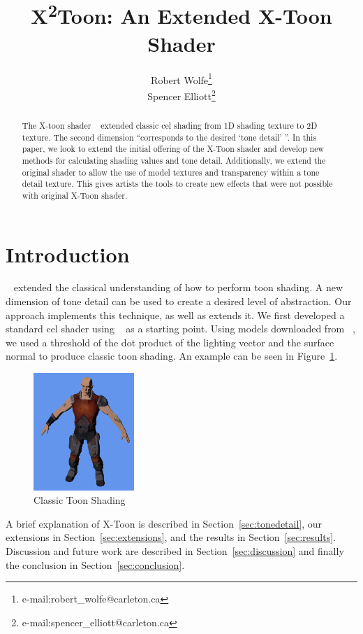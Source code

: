 \documentclass[annual]{acmsiggraph}
\title{X\texorpdfstring{\textsuperscript{2}}-Toon: An Extended X-Toon Shader}
\author{Robert Wolfe\thanks{e-mail:robert\_wolfe@carleton.ca}\\Spencer Elliott\thanks{e-mail:spencer\_elliott@carleton.ca}}
\begin{document}
\maketitle

\begin{abstract}

The X-toon shader ~\cite{BTM06a} extended classic cel shading from 1D shading texture to 2D texture. The second dimension ``corresponds to the desired `tone detail' ''. In this paper, we look to extend the initial offering of the X-Toon shader and develop new methods for calculating shading values and tone detail. Additionally, we extend the original shader to allow the use of model textures and transparency within a tone detail texture. This gives artists the tools to create new effects that were not possible with original X-Toon shader.

\end{abstract}

\keywordlist

\copyrightspace

\section{Introduction}
~\cite{BTM06a} extended the classical understanding of how to perform toon shading. A new dimension of tone detail can be used to create a desired level of abstraction. Our approach implements this technique, as well as extends it. We first developed a standard cel shader using ~\cite{CelShadingTut} as a starting point. Using models downloaded from ~\cite{TurboSquid}, we used a threshold of the dot product of the lighting vector and the surface normal to produce classic toon shading. An example can be seen in Figure~\ref{fig:toonshade}.

\begin{figure}[h]
	\centering
	\includegraphics[width=1.5in]{images/classic_cel2}
	\caption{Classic Toon Shading}
	\label{fig:toonshade}
\end{figure}

A brief explanation of X-Toon is described in Section~\ref{sec:tonedetail}, our extensions in Section~\ref{sec:extensions}, and the results in Section~\ref{sec:results}. Discussion and future work are described in Section~\ref{sec:discussion} and finally the conclusion in Section~\ref{sec:conclusion}.
\end{document}
